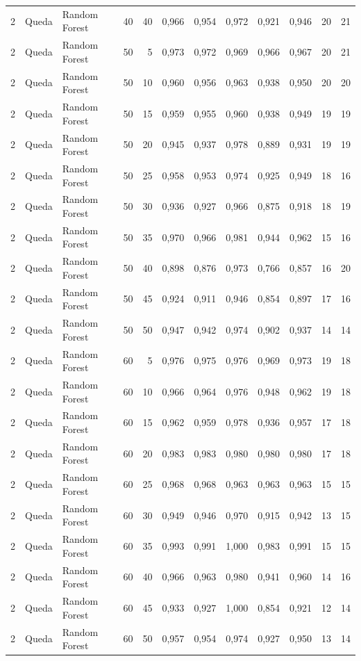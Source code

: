 \begin{longtable}{@{}rllrrrrrrrrr@{}}
2 & Queda & Random Forest & 40 & 40 & 0,966 & 0,954 & 0,972 & 0,921 & 0,946 & 20 & 21 \\
2 & Queda & Random Forest & 50 & 5 & 0,973 & 0,972 & 0,969 & 0,966 & 0,967 & 20 & 21 \\
2 & Queda & Random Forest & 50 & 10 & 0,960 & 0,956 & 0,963 & 0,938 & 0,950 & 20 & 20 \\
2 & Queda & Random Forest & 50 & 15 & 0,959 & 0,955 & 0,960 & 0,938 & 0,949 & 19 & 19 \\
2 & Queda & Random Forest & 50 & 20 & 0,945 & 0,937 & 0,978 & 0,889 & 0,931 & 19 & 19 \\
2 & Queda & Random Forest & 50 & 25 & 0,958 & 0,953 & 0,974 & 0,925 & 0,949 & 18 & 16 \\
2 & Queda & Random Forest & 50 & 30 & 0,936 & 0,927 & 0,966 & 0,875 & 0,918 & 18 & 19 \\
2 & Queda & Random Forest & 50 & 35 & 0,970 & 0,966 & 0,981 & 0,944 & 0,962 & 15 & 16 \\
2 & Queda & Random Forest & 50 & 40 & 0,898 & 0,876 & 0,973 & 0,766 & 0,857 & 16 & 20 \\
2 & Queda & Random Forest & 50 & 45 & 0,924 & 0,911 & 0,946 & 0,854 & 0,897 & 17 & 16 \\
2 & Queda & Random Forest & 50 & 50 & 0,947 & 0,942 & 0,974 & 0,902 & 0,937 & 14 & 14 \\
2 & Queda & Random Forest & 60 & 5 & 0,976 & 0,975 & 0,976 & 0,969 & 0,973 & 19 & 18 \\
2 & Queda & Random Forest & 60 & 10 & 0,966 & 0,964 & 0,976 & 0,948 & 0,962 & 19 & 18 \\
2 & Queda & Random Forest & 60 & 15 & 0,962 & 0,959 & 0,978 & 0,936 & 0,957 & 17 & 18 \\
2 & Queda & Random Forest & 60 & 20 & 0,983 & 0,983 & 0,980 & 0,980 & 0,980 & 17 & 18 \\
2 & Queda & Random Forest & 60 & 25 & 0,968 & 0,968 & 0,963 & 0,963 & 0,963 & 15 & 15 \\
2 & Queda & Random Forest & 60 & 30 & 0,949 & 0,946 & 0,970 & 0,915 & 0,942 & 13 & 15 \\
2 & Queda & Random Forest & 60 & 35 & 0,993 & 0,991 & 1,000 & 0,983 & 0,991 & 15 & 15 \\
2 & Queda & Random Forest & 60 & 40 & 0,966 & 0,963 & 0,980 & 0,941 & 0,960 & 14 & 16 \\
2 & Queda & Random Forest & 60 & 45 & 0,933 & 0,927 & 1,000 & 0,854 & 0,921 & 12 & 14 \\
2 & Queda & Random Forest & 60 & 50 & 0,957 & 0,954 & 0,974 & 0,927 & 0,950 & 13 & 14 \\

\end{longtable}
